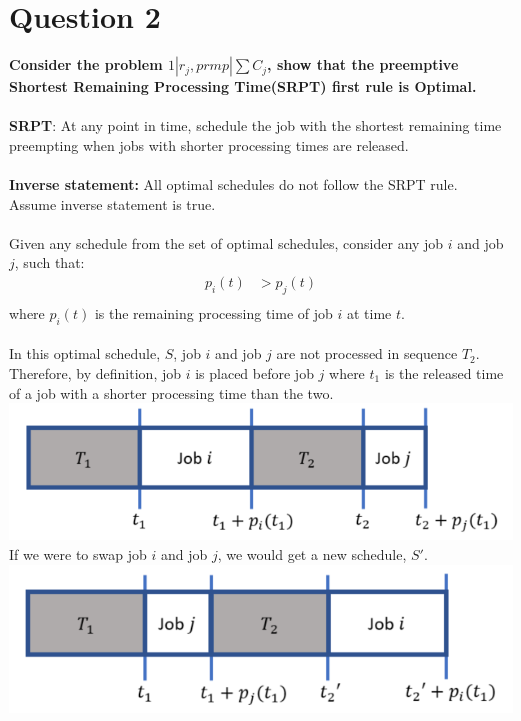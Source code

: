 \documentclass[a4paper, fleqn]{article}
\begin{document}
\section{Question 2}
\textbf{Consider the problem $1|r_j,prmp|\sum C_j$, show that the preemptive}\\
\textbf{Shortest Remaining Processing Time(SRPT) first rule is Optimal.}\\
\vspace{1pt}\\
\textbf{SRPT}: At any point in time, schedule the job with the shortest remaining time preempting when jobs with shorter processing times are released.\\
\vspace{1pt}\\
\textbf{Inverse statement:} All optimal schedules do not follow the SRPT rule.\\
Assume inverse statement is true.\\
\vspace{1pt}\\
Given any schedule from the set of optimal schedules, consider any job $i$ and job $j$, such that:
$$
\begin{aligned}
p_i(t)&>p_j(t)\\
\end{aligned}
$$
where $p_i(t)$ is the remaining processing time of job $i$ at time $t$.\\
\vspace{1pt}\\
In this optimal schedule, $S$, job $i$ and job $j$ are not processed in sequence $T_2$.\\
Therefore, by definition, job $i$ is placed before job $j$ where $t_1$ is the released time of a job with a shorter processing time than the two.\\ 
\includegraphics[width=\linewidth]{./assets/201802131917.PNG}
If we were to swap job $i$ and job $j$, we would get a new schedule, $S'$.\\
\includegraphics[width=\linewidth]{./assets/201802132355.PNG}
\end{document}
